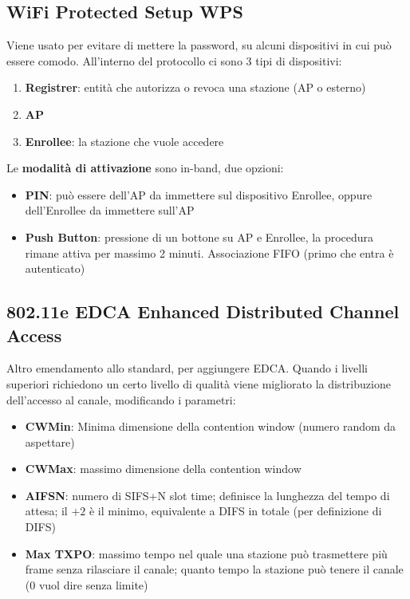 \subsection{WiFi Protected Setup WPS}
Viene usato per evitare di mettere la password, su alcuni dispositivi in cui può essere comodo. All'interno del protocollo ci sono 3 tipi di dispositivi: 
\begin{enumerate}
	\item \textbf{Registrer}: entità che autorizza o revoca una stazione (AP o esterno)
	\item \textbf{AP}
	\item \textbf{Enrollee}: la stazione che vuole accedere
\end{enumerate}

Le \textbf{modalità di attivazione} sono in-band, due opzioni: 
\begin{itemize}
	\item \textbf{PIN}: può essere dell'AP da immettere sul dispositivo Enrollee, oppure dell'Enrollee da immettere sull'AP
	\item \textbf{Push Button}: pressione di un bottone su AP e Enrollee, la procedura rimane attiva per massimo 2 minuti. Associazione FIFO (primo che entra è autenticato)
\end{itemize}

\newpage

\subsection{802.11e EDCA Enhanced Distributed Channel Access}

Altro emendamento allo standard, per aggiungere EDCA. Quando i livelli superiori richiedono un certo livello di qualità viene migliorato la distribuzione dell'accesso al canale, modificando i parametri: 
\begin{itemize}
	\item \textbf{CWMin}: Minima dimensione della contention window (numero random da aspettare)
	\item \textbf{CWMax}: massimo dimensione della contention window
	\item \textbf{AIFSN}: numero di SIFS+N slot time; definisce la lunghezza del tempo di attesa; il $+2$ è il minimo, equivalente a DIFS in totale (per definizione di DIFS)
	\item \textbf{Max TXPO}: massimo tempo nel quale una stazione può trasmettere più frame senza rilasciare il canale; quanto tempo la stazione può tenere il canale (0 vuol dire senza limite)
\end{itemize}

